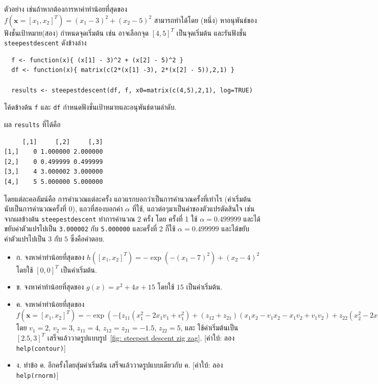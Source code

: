 ตัวอย่าง เช่นถ้าหากต้องการหาค่าทำน้อยที่สุดของ $f(\mathbf{x} = [x_1, x_2]^T) = (x_1 - 3)^2 + (x_2 - 5)^2$ สามารถทำได้โดย (หนึ่ง) หาอนุพันธ์ของฟังชั่นเป้าหมาย(สอง) กำหนดจุดเริ่มต้น เช่น อาจเลือกจุด $[4, 5]^T$ เป็นจุดเริ่มต้น และรันฟังชั่น \texttt{steepestdescent} ดังข้างล่าง
\begin{verbatim}
  f <- function(x){ (x[1] - 3)^2 + (x[2] - 5)^2 }
  df <- function(x){ matrix(c(2*(x[1] -3), 2*(x[2] - 5)),2,1) }

  results <- steepestdescent(df, f, x0=matrix(c(4,5),2,1), log=TRUE)
\end{verbatim}
โค้ดข้างต้น \texttt{f} และ \texttt{df} กำหนดฟังชั่นเป้าหมายและอนุพันธ์ตามลำดับ.

ผล \texttt{results} ที่ได้คือ
\begin{verbatim}
     [,1]     [,2]     [,3]
[1,]    0 1.000000 2.000000
[2,]    0 0.499999 0.499999
[3,]    4 3.000002 3.000000
[4,]    5 5.000000 5.000000
\end{verbatim}
โดยแต่ละคอลัมน์คือ การคำนวณแต่ละครั้ง แถวแรกบอกว่าเป็นการคำนวณครั้งที่เท่าไร (ค่าเริ่มต้น นับเป็นการคำนวณครั้งที่ $0$), แถวที่สองบอกค่า $\alpha$ ที่ใช้, แถวต่อๆมาเป็นค่าของตัวแปรตัดสินใจ เช่น 
จากผลข้างต้น \texttt{steepestdescent} ทำการคำนวณ $2$ ครั้ง
โดย
ครั้งที่ 1 ใช้ $\alpha = 0.499999$ และได้ขยับค่าตัวแปรไปเป็น \texttt{3.000002} กับ \texttt{5.000000}
และครั้งที่ 2 ก็ใช้ $\alpha = 0.499999$ และได้ขยับค่าตัวแปรไปเป็น $3$ กับ $5$ ซึ่งคือคำตอบ.

\begin{itemize}
\item ก. จงหาค่าทำน้อยที่สุดของ $h([x_1, x_2]^T) = -\exp(-(x_1 - 7)^2) + (x_2 - 4)^2$ โดยใช้ $[0, 0]^T$ เป็นค่าเริ่มต้น.

\item ข. จงหาค่าทำน้อยที่สุดของ $g(x) = x^2 + 4 x + 15$ โดยใช้ $15$ เป็นค่าเริ่มต้น.

\item ค. จงหาค่าทำน้อยที่สุดของ $f(\mathbf{x} = [x_1, x_2]^T) =
- \exp( -\{
z_{11} (x_1^2 - 2 x_1 v_1 + v_1^2)
+ (z_{12} + z_{21}) (x_1 x_2 - v_1 x_2 - x_1 v_2 + v_1 v_2)
+ z_{22} (x_2^2 -2 x_2 v_2 + v_2^2)
\} )$ 
โดย $v_1 = 2$, $v_2 = 3$, $z_{11} = 4$, $z_{12} = z_{21} = -1.5$, $z_{22} = 5$, และ ใช้ค่าเริ่มต้นเป็น $[2.5,3]^T$ เสร็จแล้ววาดรูปแบบรูป~\ref{fig: steepest descent zig zag}.
[คำใบ้: ลอง \texttt{help(contour)}]

\item ง. ทำข้อ ค. อีกครั้งโดยสุ่มค่าเริ่มต้น เสร็จแล้ววาดรูปแบบเดียวกับ ค.
[คำใบ้: ลอง \texttt{help(rnorm)}]

\end{itemize}






